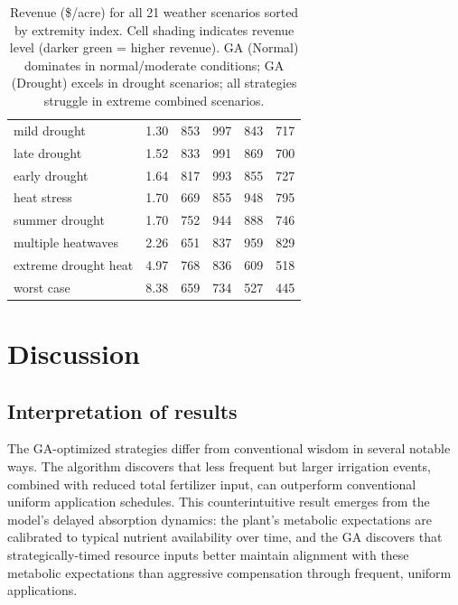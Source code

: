 \documentclass[pdflatex,sn-mathphys-num]{sn-jnl}
\begin{document}
\begin{table}[ht]
\begin{tabular}{|l|c|c|c|c|c|}
mild drought         & 1.30 & \cellcolor{c5}853 & \cellcolor{c7}997 & \cellcolor{c5}843 & \cellcolor{c4}717 \\
late drought         & 1.52 & \cellcolor{c5}833 & \cellcolor{c6}991 & \cellcolor{c5}869 & \cellcolor{c4}700 \\
early drought        & 1.64 & \cellcolor{c5}817 & \cellcolor{c6}993 & \cellcolor{c5}855 & \cellcolor{c4}727 \\
heat stress          & 1.70 & \cellcolor{c3}669 & \cellcolor{c5}855 & \cellcolor{c6}948 & \cellcolor{c4}795 \\
summer drought       & 1.70 & \cellcolor{c4}752 & \cellcolor{c6}944 & \cellcolor{c5}888 & \cellcolor{c4}746 \\
multiple heatwaves   & 2.26 & \cellcolor{c3}651 & \cellcolor{c5}837 & \cellcolor{c6}959 & \cellcolor{c5}829 \\
extreme drought heat & 4.97 & \cellcolor{c4}768 & \cellcolor{c5}836 & \cellcolor{c3}609 & \cellcolor{c2}518 \\
worst case           & 8.38 & \cellcolor{c3}659 & \cellcolor{c4}734 & \cellcolor{c2}527 & \cellcolor{c1}445 \\
\hline
\end{tabular}
\caption{Revenue (\$/acre) for all 21 weather scenarios sorted by extremity index. Cell shading indicates revenue level (darker green = higher revenue). GA (Normal) dominates in normal/moderate conditions; GA (Drought) excels in drought scenarios; all strategies struggle in extreme combined scenarios.}
\label{tab:scenario-results}
\end{table}

\section{Discussion}\label{sec:discussion}

\subsection{Interpretation of results}\label{subsec:interpretation}

The GA-optimized strategies differ from conventional wisdom in several notable ways. The algorithm discovers that less frequent but larger irrigation events, combined with reduced total fertilizer input, can outperform conventional uniform application schedules. This counterintuitive result emerges from the model's delayed absorption dynamics: the plant's metabolic expectations are calibrated to typical nutrient availability over time, and the GA discovers that strategically-timed resource inputs better maintain alignment with these metabolic expectations than aggressive compensation through frequent, uniform applications.
\end{document}
